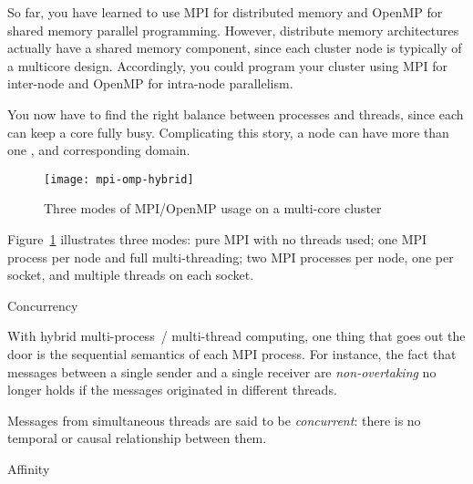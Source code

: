 
So far, you have learned to use MPI for distributed memory and OpenMP
for shared memory parallel programming. However, distribute memory
architectures actually have a shared memory component, since each
cluster node is typically of a multicore design. Accordingly, you
could program your cluster using MPI for inter-node and OpenMP for
intra-node parallelism.

You now have to find the right balance between processes and threads,
since each can keep a core fully busy.
Complicating this story, a node can have more than one ,
and corresponding  domain.
%
\begin{figure}[ht]
  \texttt{[image: mpi-omp-hybrid]}
  \caption{Three modes of MPI/OpenMP usage on a multi-core cluster}
  \label{fig:hybrid-modes}
\end{figure}
%
Figure~\ref{fig:hybrid-modes} illustrates three modes: pure MPI
with no threads used; one MPI process per node and full
multi-threading; two MPI processes per node, one per socket, and
multiple threads on each socket.

 {Concurrency}
\label{sec:hybrid-order}

With hybrid multi-process~/ multi-thread computing, one thing that goes
out the door is the sequential semantics of each MPI process.
For instance, the fact that messages between a single sender
and a single receiver are \emph{non-overtaking}
no longer holds if the messages originated in different threads.

\begin{multicols}{2}
\end{multicols}

Messages from simultaneous threads are said to be
\emph{concurrent}:
there is no temporal or causal relationship between them.

 {Affinity}

